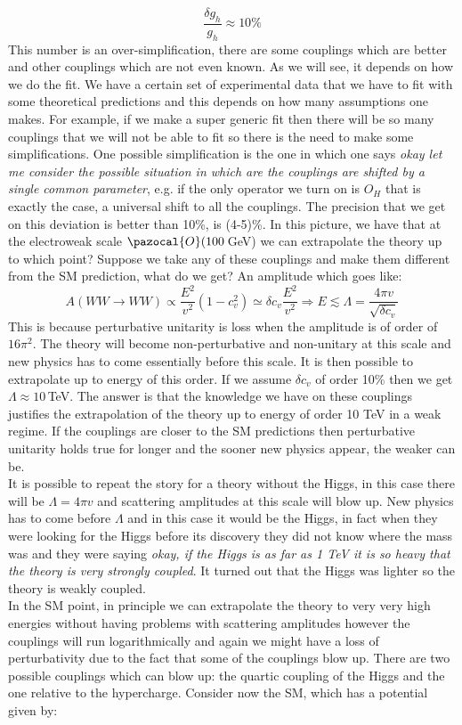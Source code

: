 \documentclass[../main.tex]{subfiles}
\begin{document}
\[
\frac{\delta g_h}{g_h}\approx10\%
\]
This number is an over-simplification, there are some couplings which are better and other couplings which are not even known. As we will see, it depends on how we do the fit. We have a certain set of experimental data that we have to fit with some theoretical predictions and this depends on how many assumptions one makes. For example, if we make a super generic fit then there will be so many couplings that we will not be able to fit so there is the need to make some simplifications. One possible simplification is the one in which one says \textit{okay let me consider the possible situation in which are the couplings are shifted by a single common parameter}, e.g. if the only operator we turn on is $O_H$ that is exactly the case, a universal shift to all the couplings. The precision that we get on this deviation is better than 10\%, is (4-5)\%. In this picture, we have that at the electroweak scale $\pazocal{O}(100$\,GeV) we can extrapolate the theory up to which point? Suppose we take any of these couplings and make them different from the SM prediction, what do we get? An amplitude which goes like:
\[
A(WW\to WW)\propto\frac{E^2}{v^2}(1-c_v^2)\simeq\delta c_v\frac{E^2}{v^2}\Rightarrow E\lesssim\Lambda=\frac{4\pi v}{\sqrt{\delta c_v}}
\]
This is because perturbative unitarity is loss when the amplitude is of order of $16\pi^2$. The theory will become non-perturbative and non-unitary at this scale and new physics has to come essentially before this scale. It is then possible to extrapolate up to energy of this order. If we assume $\delta c_v$ of order 10\% then we get $\Lambda\approx10$\,TeV. The answer is that the knowledge we have on these couplings justifies the extrapolation of the theory up to energy of order 10 TeV in a weak regime. If the couplings are closer to the SM predictions then perturbative unitarity holds true for longer and the sooner new physics appear, the weaker can be.\\
It is possible to repeat the story for a theory without the Higgs, in this case there will be $\Lambda=4\pi v$ and scattering amplitudes at this scale will blow up. New physics has to come before $\Lambda$ and in this case it would be the Higgs, in fact when they were looking for the Higgs before its discovery they did not know where the mass was and they were saying \textit{okay, if the Higgs is as far as 1 TeV it is so heavy that the theory is very strongly coupled}. It turned out that the Higgs was lighter so the theory is weakly coupled.\\
In the SM point, in principle we can extrapolate the theory to very very high energies without having problems with scattering amplitudes however the couplings will run logarithmically and again we might have a loss of perturbativity due to the fact that some of the couplings blow up. There are two possible couplings which can blow up: the quartic coupling of the Higgs and the one relative to the hypercharge.  Consider now the SM, which has a potential given by:
\end{document}
